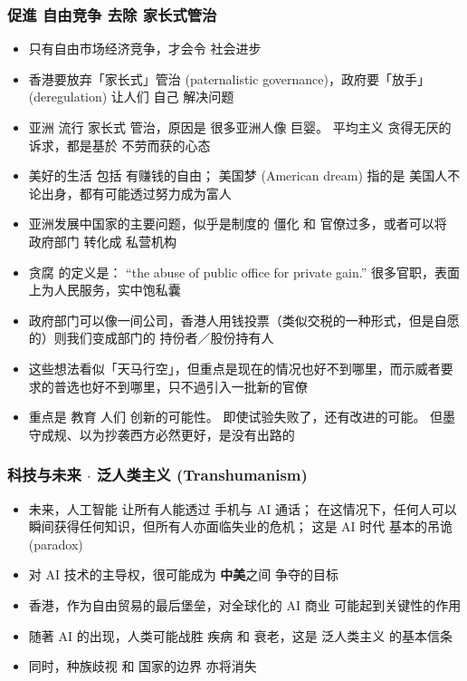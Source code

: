 \documentclass[10pt]{beamer}
\newcommand{\emp}[1]{{\color{blue}#1}}
\newif\ifframeinlbf
\begin{document}
\begin{frame}
\frametitle{促進 自由竞争 \textbullet 去除 家长式管治}
\begin{itemize}
	\item 只有自由市场经济竞争，才会令 社会进步
	
	\item 香港要放弃「家长式」管治 (paternalistic governance)，政府要「放手」(\emp{deregulation}) 让人们 自己 解决问题
	
	\item 亚洲 流行 家长式 管治，原因是 很多亚洲人像 巨婴。 \emp{平均主义} 贪得无厌的诉求，都是基於 不劳而获的心态
	
	\item 美好的生活 包括 有赚钱的自由； 美国梦 (American dream) 指的是 美国人不论出身，都有可能透过努力成为富人
	
	\item 亚洲发展中国家的主要问题，似乎是制度的 僵化 和 \emp{官僚}过多，或者可以将 政府部门 转化成 私营机构
	
	\item \emp{贪腐} 的定义是： ``the abuse of public office for private gain.''  很多官职，表面上为人民服务，实中饱私囊

	\item 政府部门可以像一间公司，香港人用钱投票（类似交税的一种形式，但是自愿的）则我们变成部门的 持份者／股份持有人
	
	\item 这些想法看似「天马行空」，但重点是现在的情况也好不到哪里，而示威者要求的普选也好不到哪里，只不過引入一批新的官僚
	
	\item 重点是 教育 人们 \emp{创新的可能性}。 即使试验失败了，还有改进的可能。 但墨守成规、以为抄袭西方必然更好，是没有出路的

\end{itemize}
\end{frame}


\frameinlbftrue
\begin{frame}
\frametitle{科技与未来 $\cdot$ 泛人类主义 (Transhumanism)}
\begin{itemize}
	\item 未来，人工智能 让所有人能透过 手机与 AI 通话； 在这情况下，任何人可以瞬间获得任何知识，但所有人亦面临失业的危机； 这是 AI 时代 基本的吊诡 (paradox)
	
	\item 对 AI 技术的主导权，很可能成为 \textbf{中美}之间 争夺的目标
	
	\item 香港，作为自由贸易的最后堡垒，对全球化的 AI 商业 可能起到关键性的作用
	
	\item 随著 AI 的出现，人类可能战胜 疾病 和 衰老，这是 \emp{泛人类主义} 的基本信条
	
	\item 同时，种族歧视 和 国家的边界 亦将消失
\end{itemize}
\end{frame}
\end{document}
